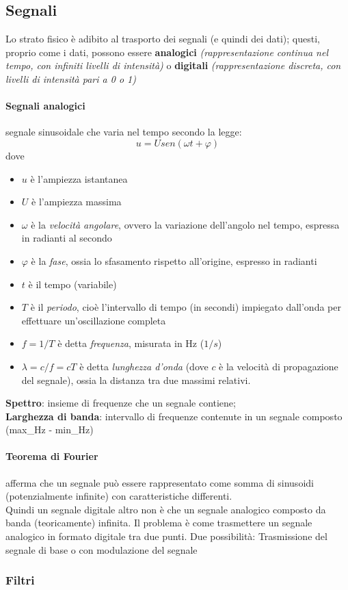 \documentclass[a4paper,11pt]{article}
\def\para#1{\paragraph{#1}\label{#1}}
\begin{document}
\subsection{Segnali}
Lo strato fisico è adibito al trasporto dei segnali (e quindi dei dati); questi, proprio come i dati, possono essere \textbf{analogici}\textit{ (rappresentazione continua nel tempo, con infiniti livelli di intensità) }o \textbf{digitali}\textit{ (rappresentazione discreta, con livelli di intensità pari a 0 o 1)}
\para{Segnali analogici} segnale sinusoidale che varia nel tempo secondo la legge:  \[u=Usen(\omega t+\varphi )\] dove 
\begin{itemize}
\item $u$ è l'ampiezza istantanea
\item $U$ è l'ampiezza massima 
\item $\omega $ è la \textit{velocità angolare}, ovvero la variazione dell'angolo nel tempo, espressa in radianti al secondo
\item $\varphi $ è la \textit{fase}, ossia lo sfasamento rispetto all'origine, espresso in radianti
\item $t$ è il tempo (variabile)
\item $T$ è il \textit{periodo}, cioè l'intervallo di tempo (in secondi) impiegato dall'onda per effettuare un'oscillazione completa
\item $f=1/T$ è detta \textit{frequenza}, misurata in Hz ($1/s $)
\item $\lambda =c/f =cT$ è detta \textit{lunghezza d'onda} (dove $c$ è la velocità di propagazione del segnale), ossia la distanza tra due massimi relativi.
\end{itemize}
\textbf{Spettro}: insieme di frequenze che un segnale contiene;\\
\textbf{Larghezza di banda}: intervallo di frequenze contenute in un segnale composto (max\_Hz - min\_Hz)
\para{Teorema di Fourier} afferma che un segnale può essere rappresentato come somma di sinusoidi (potenzialmente infinite) con caratteristiche differenti. \\Quindi un segnale digitale altro non è che un segnale analogico composto da banda (teoricamente) infinita.
Il problema è come trasmettere un segnale analogico in formato digitale tra due punti. Due possibilità: Trasmissione del segnale di base o con modulazione del segnale
\newpage \subsubsection{Filtri}
\end{document}
